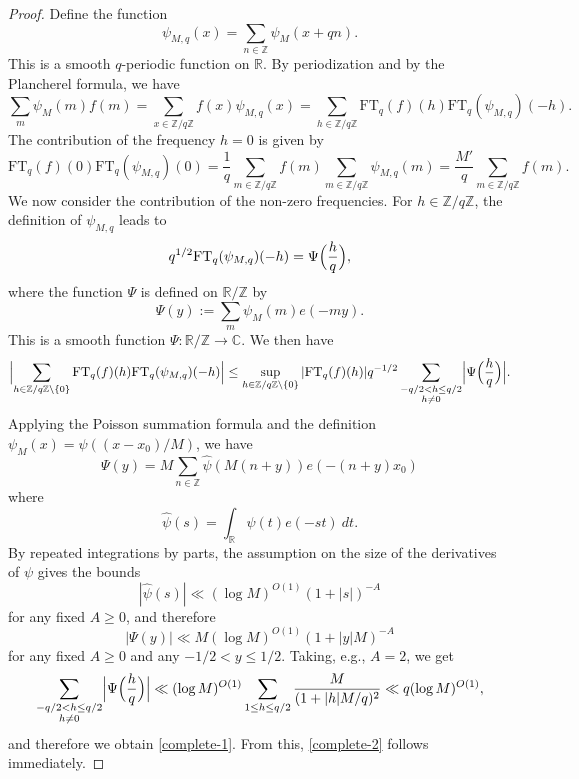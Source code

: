\documentclass[12pt,a4paper,reqno]{amsart}
\numberwithin{equation}{section}
\newcommand{\FT}{\mathrm{FT}}
\theoremstyle{plain}
\theoremstyle{definition}
\newcommand\R{\mathbb{R}}
\newcommand\Z{\mathbb{Z}}
\newcommand\C{\mathbb{C}}
\newcommand\Rr{\mathbb{R}}
\newcommand\Zz{\mathbb{Z}}
\newcommand{\ra}{\rightarrow}
\begin{document}
\begin{proof}  Define the function
$$
\psi_{M,q}(x)=\sum_{n\in\Zz}\psi_M(x+qn).
$$
This is a smooth $q$-periodic function on $\R$. By periodization and
by the Plancherel formula, we have
\begin{equation}\label{plancherel-result}
  \sum_m \psi_M(m) f(m)=\sum_{x\in\Zz/q\Zz}f(x)\psi_{M,q}(x)=\sum_{h\in\Zz/q\Zz}\FT_q(f)(h)\FT_q(\psi_{M,q})(-h).
\end{equation}
The contribution of the frequency $h=0$ is given by
$$
\FT_q(f)(0)\FT_q(\psi_{M,q})(0)=\frac{1}{q} \sum_{m \in \Z/q\Z}f(m)
\sum_{m\in\Z/q\Z} \psi_{M,q}(m)=\frac{M'}{q} \sum_{m \in \Z/q\Z}f(m).
$$
We now consider the contribution of the non-zero frequencies. For
$h\in \Z/q\Z$, the definition of $\psi_{M,q}$ leads to
$$
q^{1/2}\FT_q(\psi_{M,q})(-h)=\Psi\Bigl(\frac{h}{q}\Bigr),
$$
where the function $\Psi$ is defined on $\R/\Z$ by
$$
  \Psi(y):=\sum_m \psi_M(m) e(-my).
$$
This is a smooth function $\Psi\colon \Rr/\Zz\ra \C$. We then have
$$
\Bigl|
\sum_{h\in\Zz/q\Zz\backslash\{0\}}\FT_q(f)(h)\FT_q(\psi_{M,q})(-h)
\Bigr|\leq \sup_{h\in \Z/q\Z\backslash\{0\}}
|\FT_q(f)(h)|q^{-1/2}\sum_{\substack{-q/2<h\leq q/2\\h\neq 0}}
\Bigl|\Psi\Bigl(\frac{h}{q}\Bigr)\Bigr|.
$$
Applying the Poisson summation formula and the definition
$\psi_M(x)=\psi((x-x_0)/M)$, we have
$$ 
\Psi(y) = M \sum_{n\in \Z} \hat \psi(M(n+y)) e(-(n+y)x_0)
$$
where
$$ 
\hat \psi(s) =\int_\R \psi(t) e(-st)\ dt.
$$
By repeated integrations by parts, the assumption on the size of the
derivatives of $\psi$ gives the bounds
$$
 |\hat \psi(s)| \ll (\log M)^{O(1)} (1+|s|)^{-A}
$$
for any fixed $A \geq 0$, and therefore
\begin{equation}\label{eq-decay-psi}
|\Psi(y)|\ll M (\log M)^{O(1)} (1 + |y|M)^{-A}
\end{equation}
for any fixed $A \geq 0$ and any $-1/2<y\leq 1/2$. Taking, e.g.,
$A=2$, we get
$$
\sum_{\substack{-q/2<h\leq q/2\\h\neq 0}}
\Bigl|\Psi\Bigl(\frac{h}{q}\Bigr)\Bigr| \ll (\log M)^{O(1)}\sum_{1\leq
  h\leq q/2}\frac{M}{(1+|h|M/q)^2} \ll q(\log M)^{O(1)},
$$
and therefore we obtain \eqref{complete-1}. From this,
\eqref{complete-2} follows immediately.


\end{proof}
\end{document}
